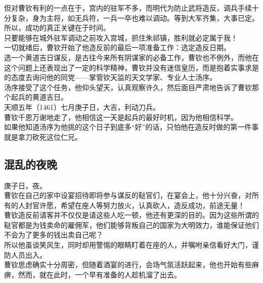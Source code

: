 \begin{multicols}{\theparacolNo}
但对曹钦有利的一点在于，宫内的驻军不多，而明代为防止武将造反，调兵手续十分复杂，身为主将，如无兵符，一兵一卒也难以调动。等到大军齐集，大事已定。所以，成功的真正关键在于时间。\\

只要能够在城外驻军调动之前攻入宫城，抓住朱祁镇，胜利就必定属于我！\\

一切就绪后，曹钦开始了他造反前的最后一项准备工作：选定造反日期。\\

选一个黄道吉日谋反，是古往今来所有阴谋家的必备工作，曹钦也不例外，而他在这个问题上还表现出了一定的科学精神，曹钦并没有迷信皇历，而是抱着实事求是的态度去询问他的同党——掌管钦天监的天文学家、专业人士汤序。\\

汤序接受了这个任务，他仰头望天，认真观察许久，然后面目严肃地告诉了曹钦那个起兵的黄道吉日。\\

天顺五年（1461）七月庚子日，大吉，利动刀兵。\\

曹钦千恩万谢地走了，他相信这一天是起兵的最好时机，因为他相信科学。\\

如果他知道汤序为他挑的这个日子到底多“好”的话，只怕他在造反时做的第一件事就是拿刀砍死这位仁兄。\\

\subsection{混乱的夜晚}
庚子日，夜。\\

曹钦在自己的家中设宴招待即将参与谋反的鞑官们，在宴会上，他十分兴奋，对所有的人封官许愿，希望在座人等努力放火，认真砍人，造反成功，前途无量！\\

曹钦造反前请客并不仅仅是请这些人吃一顿，他还有更深的目的。因为这些所谓的鞑官都是为钱卖命的雇佣军，他们能够背叛自己的国家为大明效力，谁能保证他们不会为了更多的钱出卖自己呢？\\

所以他虽谈笑风生，同时却用警惕的眼睛盯着在座的人，并嘱咐亲信看好大门，谨防人员出入。\\

曹钦思虑确实十分周密，但随着酒宴的进行，会场气氛活跃起来，他也开始有些麻痹，然而，就在此时，一个早有准备的人趁机溜了出去。\\


\end{multicols}
